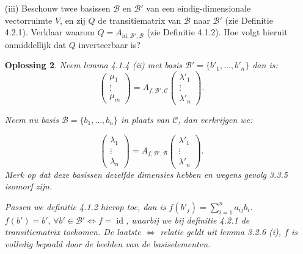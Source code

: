 \documentclass[a4paper,12pt]{article}
\newtheorem{oplossing}{Oplossing}
\begin{document}
\begin{enumerate}
\begin{oplossing}
       Stel dat de $f(b)$'s niet twee aan twee  verschillend zijn, en \(f(b_1) = f(b_2)\), dan geldt \(\lambda_{b_1}b_1 + \lambda_{b_2} b_2 = 0\) voor \(\lambda_{b_1} = - \lambda_{b_2}\) waarbij ze niet persee \(0\) hoeeven te zijn!
       Hieruit volgt dat het twee aan twee verschillend zijn een noodzakelijke voorwaarde is.
       \qed
    \end{oplossing}
    \item[(iii)] Beschouw twee basissen $\mathcal{B}$ en $\mathcal{B}'$ van een eindig-dimensionale vectorruimte $V$, en zij $Q$ de transitiematrix van $\mathcal{B}$ naar $\mathcal{B}'$ (zie Definitie 4.2.1). Verklaar waarom $Q = A_{\text{id},\mathcal{B}',\mathcal{B}}$ (zie Definitie 4.1.2). Hoe volgt hieruit onmiddellijk dat $Q$ inverteerbaar is?
    \begin{oplossing}
        Neem lemma 4.1.4 (ii) met basis \(\mathcal{B}' = \{b'_1,\dots,b'_n\}\) dan is:
        \[
        \begin{pmatrix}
            \mu_1 \\ \vdots \\ \mu_m
        \end{pmatrix}
        =
        A_{f,\mathcal{B}',\mathcal{C}}
        \begin{pmatrix}
            \lambda'_1 \\ \vdots \\ \lambda'_n
        \end{pmatrix}.
        \]

        Neem nu basis \(\mathcal{B} = \{b_1,\dots, b_n\} \) in plaats van \(\mathcal{C}\), dan verkrijgen we:

        \[
        \begin{pmatrix}
            \lambda_1 \\ \vdots \\ \lambda_n
        \end{pmatrix}
        =
        A_{f,\mathcal{B}',\mathcal{B}}
        \begin{pmatrix}
            \lambda'_1 \\ \vdots \\ \lambda'_n
        \end{pmatrix}.
        \]
        Merk op dat deze basissen dezelfde dimensies hebben en wegens gevolg 3.3.5 isomorf zijn.

        Passen we definitie 4.1.2 hierop toe, dan is \(f(b'_j) = \sum_{i=1}^{n} a_{ij}b_i\).
        \(f(b') = b', \,\forall b' \in \mathcal{B}' \iff f = \operatorname{id} \), waarbij we bij definitie 4.2.1 de transitiematrix toekomen.
        De laatste \(\iff\) relatie geldt uit lemma 3.2.6 (i), \(f\) is volledig bepaald door de beelden van de basiselementen.
        

\end{oplossing}
\end{enumerate}
\end{document}
